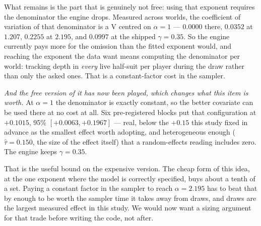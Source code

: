 \documentclass[11pt,letterpaper]{article}
\begin{document}
\begin{itemize}
What remains is the part that is genuinely not free: using that exponent
requires the denominator the engine drops. Measured across worlds, the
coefficient of variation of that denominator is a V centred on $\alpha = 1$ ---
$0.0000$ there, $0.0352$ at $1.207$, $0.2255$ at $2.195$, and $0.0997$ at the
shipped $\gamma = 0.35$. So the engine currently pays more for the omission than
the fitted exponent would, and reaching the exponent the data want means
computing the denominator per world: tracking depth in \emph{every} live
half-suit per player during the draw rather than only the asked ones. That is a
constant-factor cost in the sampler.

\emph{And the free version of it has now been played, which changes what this
item is worth.} At $\alpha = 1$ the denominator is exactly constant, so the
better covariate can be used there at no cost at all. Six pre-registered blocks
put that configuration at $+0.1015$, 95\% $[+0.0063, +0.1967]$ --- real, below
the $+0.15$ this study fixed in advance as the smallest effect worth adopting,
and heterogeneous enough ($\hat\tau = 0.150$, the size of the effect itself) that
a random-effects reading includes zero. The engine keeps $\gamma = 0.35$.

That is the useful bound on the expensive version. The cheap form of this idea,
at the one exponent where the model is correctly specified, buys about a tenth
of a set. Paying a constant factor in the sampler to reach $\alpha = 2.195$ has
to beat that by enough to be worth the sampler time it takes away from draws,
and draws are the largest measured effect in this study. We would now want a
sizing argument for that trade before writing the code, not after.


\end{itemize}
\end{document}
